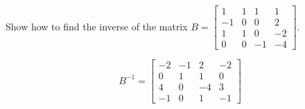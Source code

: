
\begin{exerciseStatement}


Show how to find the inverse of the matrix \(B= \left[\begin{array}{cccc}
1 & 1 & 1 & 1 \\
-1 & 0 & 0 & 2 \\
1 & 1 & 0 & -2 \\
0 & 0 & -1 & -4
\end{array}\right] \).


\end{exerciseStatement}
    
\begin{exerciseAnswer} 
\[B^{-1}= \left[\begin{array}{cccc}
-2 & -1 & 2 & -2 \\
0 & 1 & 1 & 0 \\
4 & 0 & -4 & 3 \\
-1 & 0 & 1 & -1
\end{array}\right] \]
\end{exerciseAnswer}
    
